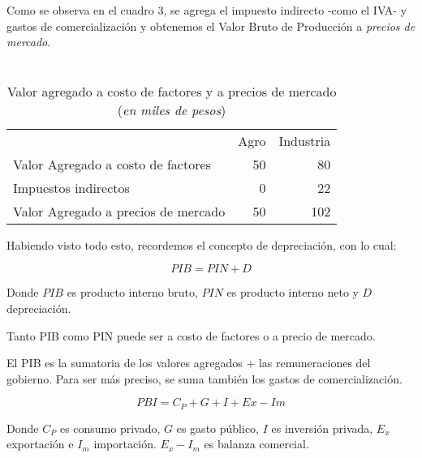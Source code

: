 Como se observa en el cuadro 3,
se agrega el impuesto indirecto -como el IVA- y gastos de comercialización
y obtenemos el Valor Bruto de Producción a \textit{precios de mercado}.

\vspace{.5cm}
\begin{table}[H]
    \centering
    \caption{\\Valor agregado a costo de factores y a precios de mercado\\
        (\textit{en miles de pesos})}
    \vspace{.5cm}
    \begin{tabular}{lrr}
        \hline
                                            & Agro & Industria \\
        Valor Agregado a costo de factores  & 50   & 80        \\
        Impuestos indirectos                & 0    & 22        \\
        \hline
        Valor Agregado a precios de mercado & 50   & 102       \\
    \end{tabular}
\end{table}
\vspace{.5cm}

Habiendo visto todo esto,
recordemos el concepto de depreciación,
con lo cual:

\begin{equation*}
    PIB = PIN + D
\end{equation*}

Donde \(PIB\) es producto interno bruto,
\(PIN\) es producto interno neto y 
\(D\) depreciación.

Tanto PIB como PIN puede ser a costo de factores o a precio de mercado.

El PIB es la sumatoria de los valores agregados + las remuneraciones del 
gobierno. Para ser más preciso, se suma también los gastos de comercialización.

\begin{equation*}
    PBI = C_P + G + I + Ex - Im
\end{equation*}

Donde \(C_P\) es consumo privado,
\(G\) es gasto público,
\(I\) es inversión privada,
\(E_x\) exportación
e \(I_m\) importación.
\(E_x - I_m\) es balanza comercial.